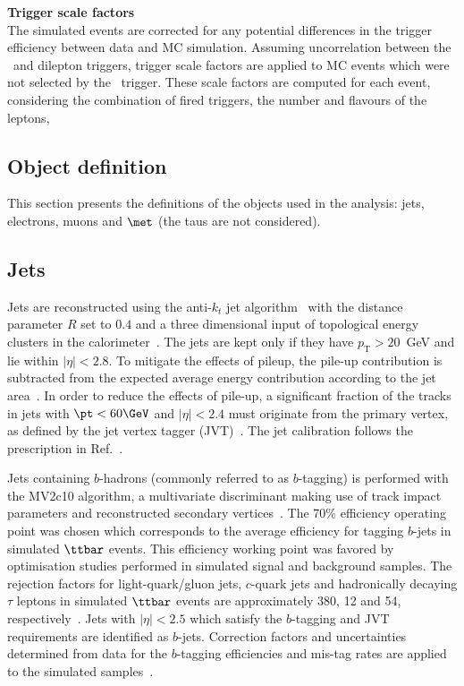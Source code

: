\par{\bfseries Trigger scale factors\\}
The simulated events are corrected for any potential differences in 
the trigger efficiency between data and MC simulation.
Assuming uncorrelation between the \met\ and dilepton triggers, 
trigger scale factors are applied to MC events which were not selected 
by the \met\ trigger.
These scale factors are computed for each event, considering the combination of fired triggers, the number and flavours of the leptons, 

\subsection{Object definition}

This section presents the definitions of the objects used in the analysis: 
jets, electrons, muons and $\met$ (the taus are not considered).

\subsection*{Jets}
\label{subsec:sec.strategy.sel.objects_jets}


Jets are reconstructed using the anti-$k_{t}$ jet algorithm~\cite{Cacciari:2008gp} 
with the distance parameter $R$ set to $0.4$ and 
a three dimensional input of topological energy clusters in the 
calorimeter~\cite{PERF-2014-07}. 
The jets are kept only if they have $p_\mathrm{T}>20$~GeV and lie 
within $|\eta|<2.8$. 
To mitigate the effects of pileup, the pile-up contribution is subtracted 
from the expected average energy contribution according to the jet area~\cite{Cacciari:2007fd,Aaboud:2017jcu}.
In order to reduce the effects of pile-up, 
a significant fraction of the tracks in jets with $\pt<60 \GeV$ and $|\eta|<2.4$ must originate from the primary vertex, 
as defined by the jet vertex tagger (JVT)~\cite{ATLAS-CONF-2014-018}. 
The jet calibration follows the prescription in Ref.~\cite{Aaboud:2017jcu}.

Jets containing $b$-hadrons (commonly referred to as $b$-tagging) 
is performed with the MV2c10 algorithm, a multivariate discriminant making 
use of track impact parameters 
and reconstructed secondary vertices~\cite{Aad:2015ydr,ATL-PHYS-PUB-2015-022}. 
The 70\% efficiency operating point was chosen which corresponds to the
average efficiency for tagging $b$-jets in simulated $\ttbar$ events. 
This efficiency working point was favored by optimisation studies performed in 
simulated signal and background samples.
The rejection factors for light-quark/gluon jets, $c$-quark jets and hadronically decaying $\tau$ leptons in simulated $\ttbar$ events 
are approximately 380, 12 and 54, respectively~\cite{ATL-PHYS-PUB-2015-022,ATL-PHYS-PUB-2016-012}. 
Jets with $|\eta|<2.5$ which satisfy the $b$-tagging and JVT requirements are identified as $b$-jets. 
Correction factors and uncertainties determined from data for the $b$-tagging efficiencies and mis-tag rates
are applied to the simulated samples~\cite{ATL-PHYS-PUB-2015-022}. 

